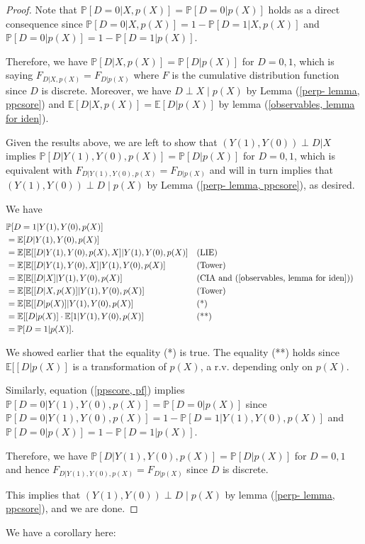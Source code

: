 \documentclass[11pt,a4paper]{amsart}
\theoremstyle{plain}
\theoremstyle{definition}
\begin{document}
\begin{proof}
		Note that  $\mathbb{P}[D=0 | X, p(X)] = \mathbb{P}[D=0 | p(X)]$ holds as a direct consequence since $\mathbb{P}[D=0 | X, p(X)] = 1- \mathbb{P}[D=1 | X, p(X)]$ and $\mathbb{P}[D=0 | p(X)] = 1- \mathbb{P}[D=1 | p(X)]$. \par 
		Therefore, we have $\mathbb{P}[D|X,p(X)] = \mathbb{P}[D|p(X)] $ for $D=0,1$, which is saying $F_{D|X,p(X)} = F_{D|p(X)}$ where $F$ is the cumulative distribution function since $D$ is discrete. Moreover, we have $D \perp X \mid p(X)$ by Lemma (\ref{perp- lemma, ppcsore}) and $\mathbb{E}[D|X,p(X)] = \mathbb{E}[D|p(X)]$ by lemma (\ref{observables, lemma for iden}).    \par 
		Given the results above, we are left to show that $(Y(1),Y(0)) \perp D | X$ implies $\mathbb{P}[D | Y(1), Y(0), p(X)] = \mathbb{P}[D| p(X)]$ for $D=0,1$, which is equivalent with $F_{D|Y(1), Y(0), p(X)} = F_{D|p(X)}$ and will in turn implies that $(Y(1),Y(0)) \perp D \mid  p(X)$ by Lemma (\ref{perp- lemma, ppcsore}), as desired.\par 
		We have
		\begin{equation}\label{ppscore, pf}
		\begin{aligned}
		&\mathbb{P}[D=1 | Y(1), Y(0), p(X)] \\
		&= \mathbb{E}[D|Y(1), Y(0), p(X)]	\\
		&=  \mathbb{E}[\mathbb{E}[[D|Y(1), Y(0), p(X),X]|Y(1), Y(0), p(X)] &&\text{(LIE)}	\\
		&=  \mathbb{E}[\mathbb{E}[[D|Y(1), Y(0), X]|Y(1), Y(0), p(X)] &&\text{(Tower)}	\\
		&= \mathbb{E}[\mathbb{E}[[D|X]|Y(1), Y(0), p(X)] &&\text{(CIA and (\ref{observables, lemma for iden}))} \\
		&= \mathbb{E}[\mathbb{E}[[D|X, p(X)]|Y(1), Y(0), p(X)] &&\text{(Tower)}	\\
		&= \mathbb{E}[\mathbb{E}[[D|p(X)]|Y(1), Y(0), p(X)] &&\text{(*)}	\\
		&= \mathbb{E}[[D|p(X)] \cdot \mathbb{E}[1|Y(1), Y(0), p(X)] &&\text{(**)}\\
		&= \mathbb{P}[D=1|p(X)].
		\end{aligned}
		\end{equation}
		
		We showed earlier that the equality (*) is true. The equality (**) holds since  $\mathbb{E}[[D|p(X)]$ is a transformation of $p(X)$, a r.v. depending only on $p(X)$. \par 
		Similarly, equation (\ref{ppscore, pf}) implies $	\mathbb{P}[D=0 | Y(1), Y(0), p(X)] = \mathbb{P}[D=0|p(X)]$ since $\mathbb{P}[D=0 | Y(1), Y(0), p(X)] = 1- \mathbb{P}[D=1 | Y(1), Y(0), p(X)]$ and $\mathbb{P}[D=0|p(X)]= 1- \mathbb{P}[D=1|p(X)] $.  \par 
		Therefore, we have $	\mathbb{P}[D | Y(1), Y(0), p(X)] = \mathbb{P}[D|p(X)]$ for $D = 0,1$ and hence $F_{D|Y(1), Y(0), p(X)} = F_{D|p(X)}$ since $D$ is discrete. \par 
		This implies that $(Y(1),Y(0)) \perp D \mid p(X)$ by lemma (\ref{perp- lemma, ppcsore}), and we are done.
	\end{proof}
	We have a corollary here:
	
\end{document}
